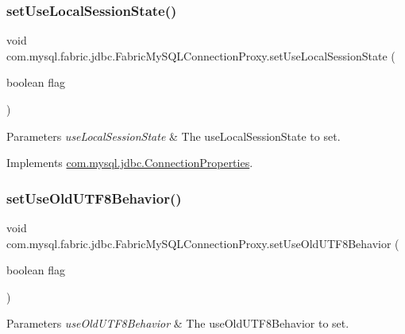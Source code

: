 \subsubsection{\texorpdfstring{set\+Use\+Local\+Session\+State()}{setUseLocalSessionState()}}
{\footnotesize\ttfamily void com.\+mysql.\+fabric.\+jdbc.\+Fabric\+My\+S\+Q\+L\+Connection\+Proxy.\+set\+Use\+Local\+Session\+State (\begin{DoxyParamCaption}\item[{boolean}]{flag }\end{DoxyParamCaption})}


\begin{DoxyParams}{Parameters}
{\em use\+Local\+Session\+State} & The use\+Local\+Session\+State to set. \\
\hline
\end{DoxyParams}


Implements \mbox{\hyperlink{interfacecom_1_1mysql_1_1jdbc_1_1_connection_properties_a27a764e918cf2d90a6bbedec87ce6820}{com.\+mysql.\+jdbc.\+Connection\+Properties}}.

\mbox{\label{classcom_1_1mysql_1_1fabric_1_1jdbc_1_1_fabric_my_s_q_l_connection_proxy_a4e9eecea6c90fba5acc7d7a4cdbd36fe}} 
\subsubsection{\texorpdfstring{set\+Use\+Old\+U\+T\+F8\+Behavior()}{setUseOldUTF8Behavior()}}
{\footnotesize\ttfamily void com.\+mysql.\+fabric.\+jdbc.\+Fabric\+My\+S\+Q\+L\+Connection\+Proxy.\+set\+Use\+Old\+U\+T\+F8\+Behavior (\begin{DoxyParamCaption}\item[{boolean}]{flag }\end{DoxyParamCaption})}


\begin{DoxyParams}{Parameters}
{\em use\+Old\+U\+T\+F8\+Behavior} & The use\+Old\+U\+T\+F8\+Behavior to set. \\
\hline
\end{DoxyParams}


